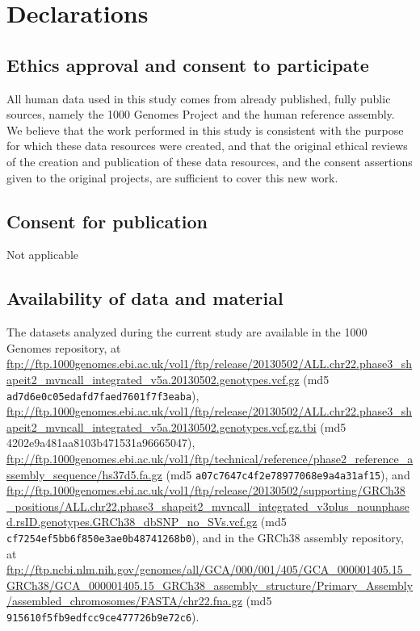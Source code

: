 \section{Declarations}

\subsection{Ethics approval and consent to participate}
All human data used in this study comes from already published, fully public sources, namely the 1000 Genomes Project and the human reference assembly. We believe that the work performed in this study is consistent with the purpose for which these data resources were created, and that the original ethical reviews of the creation and publication of these data resources, and the consent assertions given to the original projects, are sufficient to cover this new work.

\subsection{Consent for publication}
Not applicable

\subsection{Availability of data and material}
The datasets analyzed during the current study are available in the 1000 Genomes repository, at \url{ftp://ftp.1000genomes.ebi.ac.uk/vol1/ftp/release/20130502/ALL.chr22.phase3_shapeit2_mvncall_integrated_v5a.20130502.genotypes.vcf.gz} (md5 \texttt{ad7d6e0c05edafd7faed7601f7f3eaba}), \url{ftp://ftp.1000genomes.ebi.ac.uk/vol1/ftp/release/20130502/ALL.chr22.phase3_shapeit2_mvncall_integrated_v5a.20130502.genotypes.vcf.gz.tbi} (md5 4202e9a481aa8103b471531a96665047), \url{ftp://ftp.1000genomes.ebi.ac.uk/vol1/ftp/technical/reference/phase2_reference_assembly_sequence/hs37d5.fa.gz} (md5 \texttt{a07c7647c4f2e78977068e9a4a31af15}), and \url{ftp://ftp.1000genomes.ebi.ac.uk/vol1/ftp/release/20130502/supporting/GRCh38_positions/ALL.chr22.phase3_shapeit2_mvncall_integrated_v3plus_nounphased.rsID.genotypes.GRCh38_dbSNP_no_SVs.vcf.gz} (md5 \texttt{cf7254ef5bb6f850e3ae0b48741268b0}), and in the GRCh38 assembly repository, at \url{ftp://ftp.ncbi.nlm.nih.gov/genomes/all/GCA/000/001/405/GCA_000001405.15_GRCh38/GCA_000001405.15_GRCh38_assembly_structure/Primary_Assembly/assembled_chromosomes/FASTA/chr22.fna.gz} (md5 \texttt{915610f5fb9edfcc9ce477726b9e72c6}).

